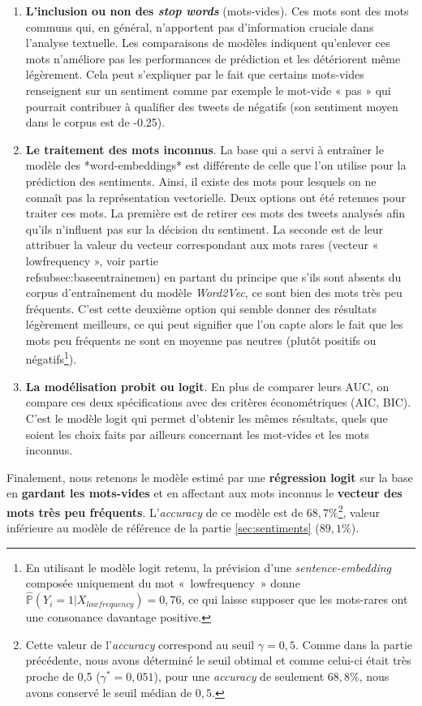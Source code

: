 \documentclass[11pt,french,french]{article}
\let\rmarkdownfootnote\footnote%
\def\footnote{\protect\rmarkdownfootnote}
\begin{document}
\begin{enumerate}
\item \textbf{L’inclusion ou non des \emph{stop words}} (mots-vides). Ces mots sont des mots communs qui, en général, n’apportent pas d’information cruciale dans l’analyse textuelle. Les comparaisons de modèles indiquent qu’enlever ces mots n’améliore pas les performances de prédiction et les détériorent même légèrement. Cela peut s’expliquer par le fait que certains mots-vides renseignent sur un sentiment comme par exemple le mot-vide « pas » qui pourrait contribuer à qualifier des tweets de négatifs (son sentiment moyen dans le corpus est de -0.25).

\item \textbf{Le traitement des mots inconnus}. La base qui a servi à entraîner le modèle des *word-embeddings* est différente de celle que l'on utilise pour la prédiction des sentiments. Ainsi, il existe des mots pour lesquels on ne connaît pas la représentation vectorielle. Deux options ont été retenues pour traiter ces mots. La première est de retirer ces mots des tweets analysés afin qu'ils n’influent pas sur la décision du sentiment. La seconde est de leur attribuer la valeur du vecteur correspondant aux mots rares (vecteur « lowfrequency », voir partie \\ref{subsec:baseentrainemen}) en partant du principe que s'ils sont absents du corpus d'entraînement du modèle \emph{Word2Vec}, ce sont bien des mots très peu fréquents. C’est cette deuxième option qui semble donner des résultats légèrement meilleurs, ce qui peut signifier que l’on capte alors le fait que les mots peu fréquents ne sont en moyenne pas neutres (plutôt positifs ou négatifs\footnote{En utilisant le modèle logit retenu, la prévision d'une \emph{sentence-embedding} composée uniquement du mot « lowfrequency » donne $\hat{\mathbb{P}}(Y_i = 1 | X_{lowfrequency}) = 0,76$, ce qui laisse supposer que les mots-rares ont une consonance davantage positive.}). 

\item \textbf{La modélisation probit ou logit}. En plus de comparer leurs AUC, on compare ces deux spécifications avec des critères économétriques (AIC, BIC). C’est le modèle logit qui permet d’obtenir les mêmes résultats, quels que soient les choix faits par ailleurs concernant les mot-vides et les mots inconnus.
\end{enumerate}

Finalement, nous retenons le modèle estimé par une \textbf{régression
logit} sur la base en \textbf{gardant les mots-vides } et en affectant
aux mots inconnus le \textbf{vecteur des mots très peu fréquents}.
L'\emph{accuracy} de ce modèle est de \(68,7\%\)\footnote{Cette valeur
  de l'\emph{accuracy} correspond au seuil \(\gamma = 0,5\). Comme dans
  la partie précédente, nous avons déterminé le seuil obtimal et comme
  celui-ci était très proche de 0,5 (\(\gamma^* = 0,051\)), pour une
  \emph{accuracy} de seulement \(68,8 \%\), nous avons conservé le seuil
  médian de \(0,5\).}, valeur inférieure au modèle de référence de la
partie \ref{sec:sentiments} (\(89,1\%\)).
\end{document}
